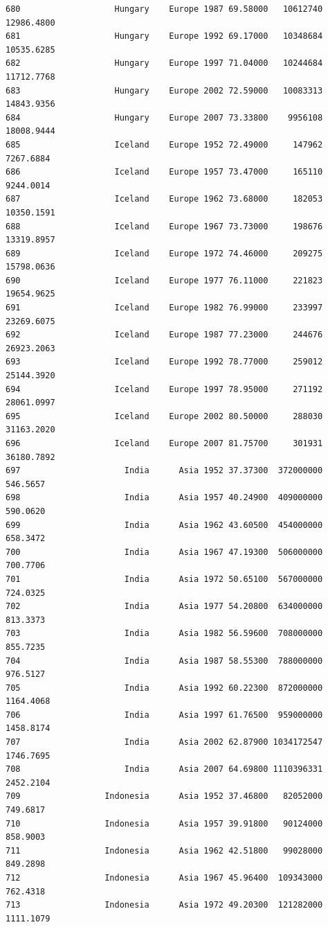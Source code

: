 \documentclass[
  letterpaper,
  DIV=11,
  numbers=noendperiod]{scrreprt}
\begin{document}
\begin{verbatim}
680                   Hungary    Europe 1987 69.58000   10612740  12986.4800
681                   Hungary    Europe 1992 69.17000   10348684  10535.6285
682                   Hungary    Europe 1997 71.04000   10244684  11712.7768
683                   Hungary    Europe 2002 72.59000   10083313  14843.9356
684                   Hungary    Europe 2007 73.33800    9956108  18008.9444
685                   Iceland    Europe 1952 72.49000     147962   7267.6884
686                   Iceland    Europe 1957 73.47000     165110   9244.0014
687                   Iceland    Europe 1962 73.68000     182053  10350.1591
688                   Iceland    Europe 1967 73.73000     198676  13319.8957
689                   Iceland    Europe 1972 74.46000     209275  15798.0636
690                   Iceland    Europe 1977 76.11000     221823  19654.9625
691                   Iceland    Europe 1982 76.99000     233997  23269.6075
692                   Iceland    Europe 1987 77.23000     244676  26923.2063
693                   Iceland    Europe 1992 78.77000     259012  25144.3920
694                   Iceland    Europe 1997 78.95000     271192  28061.0997
695                   Iceland    Europe 2002 80.50000     288030  31163.2020
696                   Iceland    Europe 2007 81.75700     301931  36180.7892
697                     India      Asia 1952 37.37300  372000000    546.5657
698                     India      Asia 1957 40.24900  409000000    590.0620
699                     India      Asia 1962 43.60500  454000000    658.3472
700                     India      Asia 1967 47.19300  506000000    700.7706
701                     India      Asia 1972 50.65100  567000000    724.0325
702                     India      Asia 1977 54.20800  634000000    813.3373
703                     India      Asia 1982 56.59600  708000000    855.7235
704                     India      Asia 1987 58.55300  788000000    976.5127
705                     India      Asia 1992 60.22300  872000000   1164.4068
706                     India      Asia 1997 61.76500  959000000   1458.8174
707                     India      Asia 2002 62.87900 1034172547   1746.7695
708                     India      Asia 2007 64.69800 1110396331   2452.2104
709                 Indonesia      Asia 1952 37.46800   82052000    749.6817
710                 Indonesia      Asia 1957 39.91800   90124000    858.9003
711                 Indonesia      Asia 1962 42.51800   99028000    849.2898
712                 Indonesia      Asia 1967 45.96400  109343000    762.4318
713                 Indonesia      Asia 1972 49.20300  121282000   1111.1079

\end{verbatim}
\end{document}
